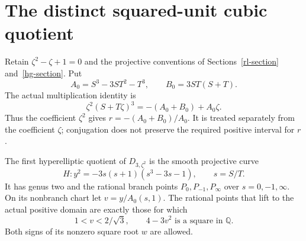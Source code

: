 \section{The distinct squared-unit cubic quotient}
\label{z2x-section}

Retain \(\zeta^2-\zeta+1=0\) and the projective conventions of
Sections~\ref{rl-section} and~\ref{hg-section}. Put
\[
 A_0=S^3-3ST^2-T^3,\qquad B_0=3ST(S+T).
\]
The actual multiplication identity is
\[
 \zeta^2(S+T\zeta)^3=-(A_0+B_0)+A_0\zeta .
\]
Thus the coefficient \(\zeta^2\) gives \(r=-(A_0+B_0)/A_0\).
It is treated separately from the coefficient \(\zeta\); conjugation
does not preserve the required positive interval for \(r\).

\begin{proposition}
\label{z2x-model}
The first hyperelliptic quotient of \(D_{3,\zeta^2}\) is the smooth
projective curve
\begin{equation}
 H:y^2=-3s(s+1)(s^3-3s-1),\qquad s=S/T.
 \label{z2x-quintic}
\end{equation}
It has genus two and the rational branch points \(P_0,P_{-1},P_\infty\)
over \(s=0,-1,\infty\). On its nonbranch chart let \(v=y/A_0(s,1)\).
The rational points that lift to the actual positive domain are
exactly those for which
\begin{equation}
 1<v<2/\sqrt3,\qquad 4-3v^2\text{ is a square in }\mathbb Q .
 \label{z2x-positive}
\end{equation}
Both signs of its nonzero square root \(w\) are allowed.
\end{proposition}
